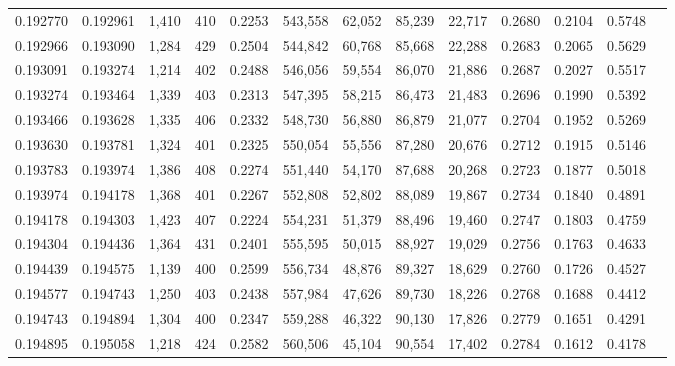 \begin{tabular}{rrrrrrrrrrrrr}
0.192770 & 0.192961 & 1,410 & 410 &                                     0.2253 & 543,558 &  62,052 &  85,239 &  22,717 & 0.2680 & 0.2104 & 0.5748 \\
0.192966 & 0.193090 & 1,284 & 429 &                                     0.2504 & 544,842 &  60,768 &  85,668 &  22,288 & 0.2683 & 0.2065 & 0.5629 \\
0.193091 & 0.193274 & 1,214 & 402 &                                     0.2488 & 546,056 &  59,554 &  86,070 &  21,886 & 0.2687 & 0.2027 & 0.5517 \\
0.193274 & 0.193464 & 1,339 & 403 &                                     0.2313 & 547,395 &  58,215 &  86,473 &  21,483 & 0.2696 & 0.1990 & 0.5392 \\
0.193466 & 0.193628 & 1,335 & 406 &                                     0.2332 & 548,730 &  56,880 &  86,879 &  21,077 & 0.2704 & 0.1952 & 0.5269 \\
0.193630 & 0.193781 & 1,324 & 401 &                                     0.2325 & 550,054 &  55,556 &  87,280 &  20,676 & 0.2712 & 0.1915 & 0.5146 \\
0.193783 & 0.193974 & 1,386 & 408 &                                     0.2274 & 551,440 &  54,170 &  87,688 &  20,268 & 0.2723 & 0.1877 & 0.5018 \\
0.193974 & 0.194178 & 1,368 & 401 &                                     0.2267 & 552,808 &  52,802 &  88,089 &  19,867 & 0.2734 & 0.1840 & 0.4891 \\
0.194178 & 0.194303 & 1,423 & 407 &                                     0.2224 & 554,231 &  51,379 &  88,496 &  19,460 & 0.2747 & 0.1803 & 0.4759 \\
0.194304 & 0.194436 & 1,364 & 431 &                                     0.2401 & 555,595 &  50,015 &  88,927 &  19,029 & 0.2756 & 0.1763 & 0.4633 \\
0.194439 & 0.194575 & 1,139 & 400 &                                     0.2599 & 556,734 &  48,876 &  89,327 &  18,629 & 0.2760 & 0.1726 & 0.4527 \\
0.194577 & 0.194743 & 1,250 & 403 &                                     0.2438 & 557,984 &  47,626 &  89,730 &  18,226 & 0.2768 & 0.1688 & 0.4412 \\
0.194743 & 0.194894 & 1,304 & 400 &                                     0.2347 & 559,288 &  46,322 &  90,130 &  17,826 & 0.2779 & 0.1651 & 0.4291 \\
0.194895 & 0.195058 & 1,218 & 424 &                                     0.2582 & 560,506 &  45,104 &  90,554 &  17,402 & 0.2784 & 0.1612 & 0.4178 \\

\end{tabular}
